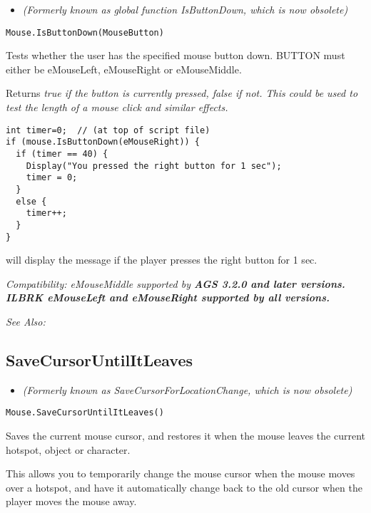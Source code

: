 \begin{itemize}
\item \it{(Formerly known as global function IsButtonDown, which is now obsolete)}
\end{itemize}

\begin{verbatim}
Mouse.IsButtonDown(MouseButton)
\end{verbatim}
Tests whether the user has the specified mouse button down. BUTTON must either
be eMouseLeft, eMouseRight or eMouseMiddle.

Returns \it{true} if the button is currently pressed, \it{false} if not. This could be used to
test the length of a mouse click and similar effects.

\begin{verbatim}
int timer=0;  // (at top of script file)
if (mouse.IsButtonDown(eMouseRight)) {
  if (timer == 40) {
    Display("You pressed the right button for 1 sec");
    timer = 0;
  }
  else {
    timer++;
  }
}
\end{verbatim}
will display the message if the player presses the right button for 1 sec.

\it{Compatibility:} \it{eMouseMiddle} supported by \bf{AGS 3.2.0} and later versions. ILBRK
\it{eMouseLeft} and \it{eMouseRight} supported by all versions.

\it{See Also:} 


\subsection{SaveCursorUntilItLeaves}\label{Mouse.SaveCursorUntilItLeaves}%

\begin{itemize}
\item \it{(Formerly known as SaveCursorForLocationChange, which is now obsolete)}
\end{itemize}

\begin{verbatim}
Mouse.SaveCursorUntilItLeaves()
\end{verbatim}
Saves the current mouse cursor, and restores it when the mouse leaves the current hotspot,
object or character.

This allows you to temporarily change the mouse cursor when the mouse moves over a hotspot,
and have it automatically change back to the old cursor when the player moves the mouse away.

